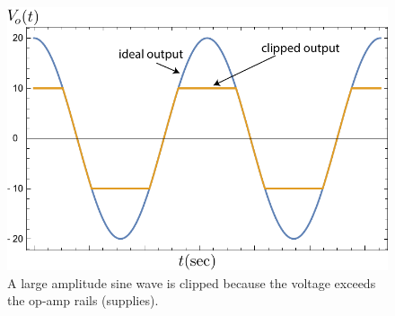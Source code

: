 \begin{figure}[tb]
\centering
\includegraphics[width=.75\columnwidth]{sin_clip}
\caption{A large amplitude sine wave is clipped because the voltage exceeds the op-amp rails (supplies).}
\label{fig:sin_clip}
\end{figure}
